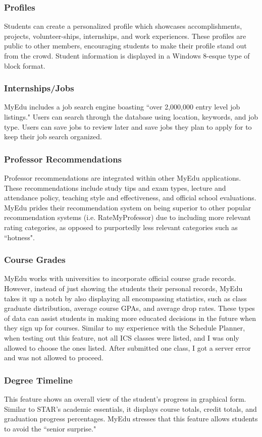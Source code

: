 \subsubsection{Profiles}
Students can create a personalized profile which showcases accomplishments, projects, volunteer-ships, internships, and work experiences. These profiles are public to other members, encouraging students to make their profile stand out from the crowd. Student information is displayed in a Windows 8-esque type of block format. 
\subsubsection{Internships/Jobs}
MyEdu includes a job search engine boasting ``over 2,000,000 entry level job listings." Users can search through the database using location, keywords, and job type. Users can save jobs to review later and save jobs they plan to apply for to keep their job search organized. 
\subsubsection{Professor Recommendations}
Professor recommendations are integrated within other MyEdu applications. These recommendations include study tips and exam types, lecture and attendance policy, teaching style and effectiveness, and official school evaluations. MyEdu prides their recommendation system on being superior to other popular recommendation systems (i.e. RateMyProfessor) due to including more relevant rating categories, as opposed to purportedly less relevant categories such as ``hotness". 
\subsubsection{Course Grades}
MyEdu works with universities to incorporate official course grade records. However, instead of just showing the students their personal records, MyEdu takes it up a notch by also displaying all encompassing statistics, such as class graduate distribution, average course GPAs, and average drop rates. These types of data can assist students in making more educated decisions in the future when they sign up for courses. Similar to my experience with the Schedule Planner, when testing out this feature, not all ICS classes were listed, and I was only allowed to choose the ones listed. After submitted one class, I got a server error and was not allowed to proceed. 
\subsubsection{Degree Timeline}
This feature shows an overall view of the student's progress in graphical form. Similar to STAR's academic essentials, it displays course totals, credit totals, and graduation progress percentages. MyEdu stresses that this feature allows students to avoid the ``senior surprise."

